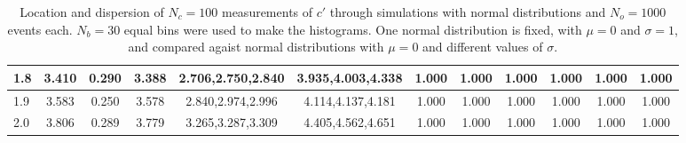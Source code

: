 \begin{table*}[h!]
\begin{center}
\begin{tabular}{| l | c | c | c | c | c | c | c | c | c | c | c |}
1.8 & 3.410 & 0.290 & 3.388 & 2.706,2.750,2.840 & 3.935,4.003,4.338  & 1.000  & 1.000  & 1.000  & 1.000  & 1.000  & 1.000 \\\hline
1.9 & 3.583 & 0.250 & 3.578 & 2.840,2.974,2.996 & 4.114,4.137,4.181  & 1.000  & 1.000  & 1.000  & 1.000  & 1.000  & 1.000 \\\hline
2.0 & 3.806 & 0.289 & 3.779 & 3.265,3.287,3.309 & 4.405,4.562,4.651  & 1.000  & 1.000  & 1.000  & 1.000  & 1.000  & 1.000 \\\hline
\end{tabular}
\caption{Location and dispersion of $N_c=100$
measurements of $c'$ through simulations
with normal distributions and $N_o=1000$ events each.
$N_b=30$ equal bins were used to make the histograms.
One normal distribution is fixed, with $\mu=0$ and $\sigma=1$,
and compared agaist normal distributions with $\mu=0$
and different values of $\sigma$.}
\end{center}
\end{table*}